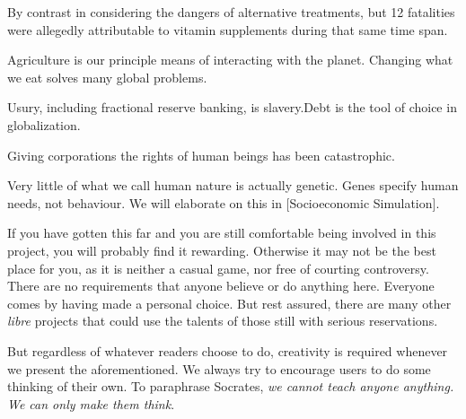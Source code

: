 By contrast in considering the dangers of alternative treatments, but 12 fatalities were allegedly attributable to vitamin supplements during that same time span. 


Agriculture is our principle means of interacting with the planet. Changing what we eat solves many global problems.


Usury, including fractional reserve banking, is slavery. Debt is the tool of choice in globalization.\footnotecite[perkins2005]


Giving corporations the rights of human beings has been catastrophic.


Very little of what we call human nature is actually genetic. Genes specify human needs, not behaviour. We will elaborate on this in [Socioeconomic Simulation].
\stopitemize

If you have gotten this far and you are still comfortable being involved in this project, you will probably find it rewarding. Otherwise it may not be the best place for you, as it is neither a casual game, nor free of courting controversy. There are no requirements that anyone believe or do anything here. Everyone comes by having made a personal choice. But rest assured, there are many other {\it libre} projects that could use the talents of those still with serious reservations.

But regardless of whatever readers choose to do, creativity is required whenever we present the aforementioned. We always try to encourage users to do some thinking of their own. To paraphrase Socrates, {\it we cannot teach anyone anything. We can only make them think}.

\StopChapter

